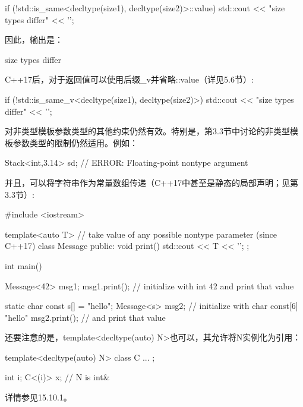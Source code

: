 \begin{cpp}
if (!std::is_same<decltype(size1), decltype(size2)>::value) {
	std::cout << "size types differ" << '\n';
}
\end{cpp}

因此，输出是：

\begin{shell}
size types differ
\end{shell}

C++17后，对于返回值可以使用后缀\_v并省略::value（详见5.6节）:

\begin{cpp}
if (!std::is_same_v<decltype(size1), decltype(size2)>) {
	std::cout << "size types differ" << '\n';
}
\end{cpp}

对非类型模板参数类型的其他约束仍然有效。特别是，第3.3节中讨论的非类型模板参数类型的限制仍然适用。例如：

\begin{cpp}
Stack<int,3.14> sd; // ERROR: Floating-point nontype argument
\end{cpp}

并且，可以将字符串作为常量数组传递（C++17中甚至是静态的局部声明；见第3.3节）:

\begin{cpp}
#include <iostream>

template<auto T> // take value of any possible nontype parameter (since C++17)
class Message {
	public:
	void print() {
		std::cout << T << '\n';
	}
};

int main()
{
	Message<42> msg1;
	msg1.print(); // initialize with int 42 and print that value
	
	static char const s[] = "hello";
	Message<s> msg2; // initialize with char const[6] "hello"
	msg2.print(); // and print that value
}
\end{cpp}

还要注意的是，template<decltype(auto) N>也可以，其允许将N实例化为引用：

\begin{cpp}
template<decltype(auto) N>
class C {
	...
};

int i;
C<(i)> x; // N is int&
\end{cpp}

详情参见15.10.1。




